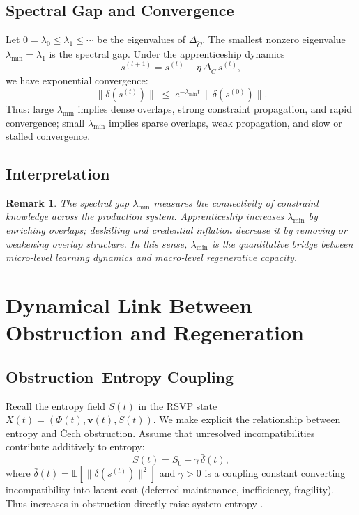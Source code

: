 \documentclass[12pt]{article}
\newtheorem{remark}{Remark}
\begin{document}
\subsection{Spectral Gap and Convergence}

Let $0 = \lambda_0 \le \lambda_1 \le \cdots$ be the eigenvalues of $\Delta_{\check{C}}$. The smallest nonzero eigenvalue $\lambda_{\min} = \lambda_1$ is the spectral gap. Under the apprenticeship dynamics
\[
s^{(t+1)} = s^{(t)} - \eta\,\Delta_{\check{C}}\,s^{(t)},
\]
we have exponential convergence:
\[
\bigl\|\delta(s^{(t)})\bigr\| \;\le\; e^{-\lambda_{\min} t}\,\bigl\|\delta(s^{(0)})\bigr\|.
\]
Thus: large $\lambda_{\min}$ implies dense overlaps, strong constraint propagation, and rapid convergence; small $\lambda_{\min}$ implies sparse overlaps, weak propagation, and slow or stalled convergence.

\subsection{Interpretation}

\begin{remark}
The spectral gap $\lambda_{\min}$ measures the \emph{connectivity of constraint knowledge} across the production system. Apprenticeship increases $\lambda_{\min}$ by enriching overlaps; deskilling and credential inflation decrease it by removing or weakening overlap structure. In this sense, $\lambda_{\min}$ is the quantitative bridge between micro-level learning dynamics and macro-level regenerative capacity.
\end{remark}

\section{Dynamical Link Between Obstruction and Regeneration}

\subsection{Obstruction--Entropy Coupling}

Recall the entropy field $S(t)$ in the RSVP state $X(t) = (\Phi(t), \mathbf{v}(t), S(t))$. We make explicit the relationship between entropy and \v{C}ech obstruction. Assume that unresolved incompatibilities contribute additively to entropy:
\begin{equation}
S(t) = S_0 + \gamma\,\bar{\delta}(t),
\end{equation}
where $\bar{\delta}(t) = \mathbb{E}[\|\delta(s^{(t)})\|^2]$ and $\gamma > 0$ is a coupling constant converting incompatibility into latent cost (deferred maintenance, inefficiency, fragility). Thus increases in obstruction directly raise system entropy \cite{Shannon1948,GeorgescuRoegen1971}.
\end{document}
